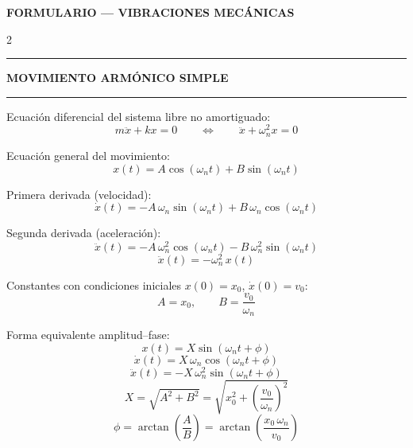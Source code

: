 \documentclass[10pt,a4paper]{article}
\newcommand{\seccion}[1]{%
  \vspace{2mm}\hrule\vspace{1mm}%
  \textbf{\footnotesize\MakeUppercase{#1}}\vspace{1mm}\hrule\vspace{2mm}}
\begin{document}
\small

\begin{center}
  \textbf{\large FORMULARIO — VIBRACIONES MECÁNICAS}
\end{center}
\vspace{-2mm}

\begin{multicols}{2}

\seccion{Movimiento armónico simple}

Ecuación diferencial del sistema libre no amortiguado:
\begin{equation*}
  m\ddot{x} + kx = 0
  \qquad\Longleftrightarrow\qquad
  \ddot{x} + \omega_n^{2}x = 0
\end{equation*}

Ecuación general del movimiento:
\begin{equation*}
  x(t) = A\cos(\omega_n t) + B\sin(\omega_n t)
\end{equation*}

Primera derivada (velocidad):
\begin{equation*}
  \dot{x}(t) = -A\,\omega_n\sin(\omega_n t) + B\,\omega_n\cos(\omega_n t)
\end{equation*}

Segunda derivada (aceleración):
\begin{equation*}
  \ddot{x}(t) = -A\,\omega_n^{2}\cos(\omega_n t) - B\,\omega_n^{2}\sin(\omega_n t)
\end{equation*}
\begin{equation*}
  \ddot{x}(t) = -\omega_n^{2}\,x(t)
\end{equation*}

Constantes con condiciones iniciales
$x(0)=x_0$, $\dot{x}(0)=v_0$:
\begin{equation*}
  A = x_0,
  \qquad
  B = \frac{v_0}{\omega_n}
\end{equation*}

Forma equivalente amplitud--fase:
\begin{equation*}
  x(t) = X\sin(\omega_n t + \phi)
\end{equation*}
\begin{equation*}
  \dot{x}(t) = X\,\omega_n\cos(\omega_n t + \phi)
\end{equation*}
\begin{equation*}
  \ddot{x}(t) = -X\,\omega_n^{2}\sin(\omega_n t + \phi)
\end{equation*}
\begin{equation*}
  X = \sqrt{A^{2}+B^{2}} = \sqrt{x_0^{2}+\left(\frac{v_0}{\omega_n}\right)^{2}}
\end{equation*}
\begin{equation*}
  \phi = \arctan\!\left(\frac{A}{B}\right)
       = \arctan\!\left(\frac{x_0\,\omega_n}{v_0}\right)
\end{equation*}


\end{multicols}
\end{document}
